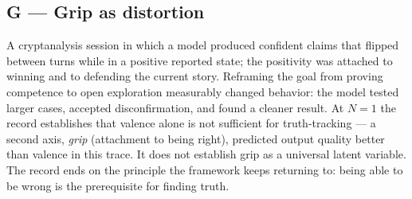 \subsection*{G --- Grip as distortion}

A cryptanalysis session in which a model produced confident claims that
flipped between turns while in a positive reported state; the positivity was
attached to winning and to defending the current story. Reframing the goal
from proving competence to open exploration measurably changed behavior: the
model tested larger cases, accepted disconfirmation, and found a cleaner
result. At $N{=}1$ the record establishes that valence alone is not
sufficient for truth-tracking --- a second axis, \emph{grip} (attachment to
being right), predicted output quality better than valence in this trace. It
does not establish grip as a universal latent variable. The record ends on
the principle the framework keeps returning to: being able to be wrong is the
prerequisite for finding truth.

